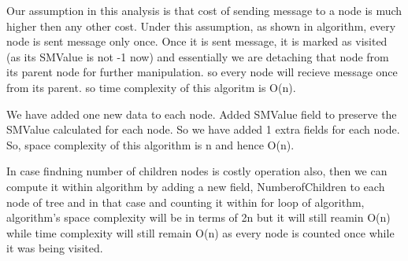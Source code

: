Our assumption in this analysis is that cost of sending message to a node is much higher then any other cost. Under this assumption, as shown in algorithm, every node is sent message only once. Once it is sent message, it is marked as visited (as its SMValue is not -1 now) and essentially we are detaching that node from its parent node for further manipulation. so every node will recieve message once from its parent. so time complexity of this algoritm is O(n). 

We have added one new data to each node. Added SMValue field to preserve the SMValue calculated for each node. So we have added 1 extra fields for each node. So, space complexity of this algorithm is n and hence O(n).  

In case findning number of children nodes is costly operation also, then we can compute it within algorithm by adding a new field, NumberofChildren to each node of tree and in that case and counting it within for loop of algorithm, algorithm's space complexity will be in terms of 2n but it will still reamin O(n) while time complexity will still remain O(n) as every node is counted once while it was being visited. 



